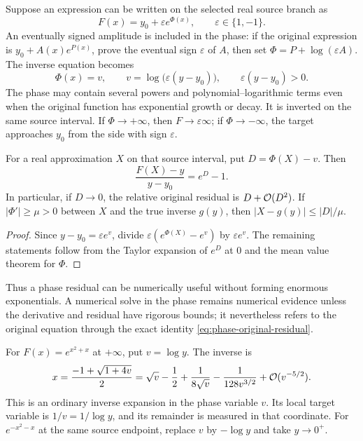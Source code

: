 Suppose an expression can be written on the selected real source branch as
\begin{equation}
 F(x)=y_0+\varepsilon e^{\Phi(x)},\qquad \varepsilon\in\{1,-1\}.
 \label{eq:coordinate-phase}
\end{equation}
An eventually signed amplitude is included in the phase: if the original expression is $y_0+A(x)e^{P(x)}$, prove the eventual sign $\varepsilon$ of $A$, then set $\Phi=P+\log(\varepsilon A)$. The inverse equation becomes
\begin{equation}
 \Phi(x)=v,\qquad v=\log\bigl(\varepsilon(y-y_0)\bigr),
 \qquad \varepsilon(y-y_0)>0.
 \label{eq:coordinate-log-target}
\end{equation}
The phase may contain several powers and polynomial--logarithmic terms even when the original function has exponential growth or decay. It is inverted on the same source interval. If $\Phi\to+\infty$, then $F\to\varepsilon\infty$; if $\Phi\to-\infty$, the target approaches $y_0$ from the side with sign $\varepsilon$.

\begin{proposition}
\label{prop:phase-residual}
For a real approximation $X$ on that source interval, put $D=\Phi(X)-v$. Then
\begin{equation}
 \frac{F(X)-y}{y-y_0}=e^D-1.
 \label{eq:phase-original-residual}
\end{equation}
In particular, if $D\to0$, the relative original residual is $D+\mathcal O(D^2)$. If $|\Phi'|\ge\mu>0$ between $X$ and the true inverse $g(y)$, then $|X-g(y)|\le|D|/\mu$.
\end{proposition}
\begin{proof}
Since $y-y_0=\varepsilon e^v$, divide $\varepsilon(e^{\Phi(X)}-e^v)$ by $\varepsilon e^v$. The remaining statements follow from the Taylor expansion of $e^D$ at $0$ and the mean value theorem for $\Phi$.
\end{proof}

Thus a phase residual can be numerically useful without forming enormous exponentials. A numerical solve in the phase remains numerical evidence unless the derivative and residual have rigorous bounds; it nevertheless refers to the original equation through the exact identity \eqref{eq:phase-original-residual}.

\begin{example}
For $F(x)=e^{x^2+x}$ at $+\infty$, put $v=\log y$. The inverse is
\[
 x=\frac{-1+\sqrt{1+4v}}2
 =\sqrt v-\frac12+\frac1{8\sqrt v}
 -\frac1{128v^{3/2}}+\mathcal O(v^{-5/2}).
\]
This is an ordinary inverse expansion in the phase variable $v$. Its local target variable is $1/v=1/\log y$, and its remainder is measured in that coordinate. For $e^{-x^2-x}$ at the same source endpoint, replace $v$ by $-\log y$ and take $y\to0^+$.
\end{example}

